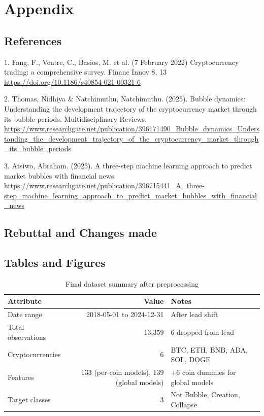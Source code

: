 \documentclass[12pt,a4paper]{article}
\begin{document}
\newpage
\section{Appendix}

\subsection{References}
1. Fang, F., Ventre, C., Basios, M. et al. (7 February 2022) Cryptocurrency trading: a comprehensive survey. Financ Innov 8, 13 \url{https://doi.org/10.1186/s40854-021-00321-6} 

2. Thomas, Nidhiya \& Natchimuthu, Natchimuthu. (2025). Bubble dynamics: Understanding the development trajectory of the cryptocurrency market through its bubble periods. Multidisciplinary Reviews. \url{https://www.researchgate.net/publication/396171490_Bubble_dynamics_Understanding_the_development_trajectory_of_the_cryptocurrency_market_through_its_bubble_periods} 

3. Atsiwo, Abraham. (2025). A three-step machine learning approach to predict market bubbles with financial news. \url{https://www.researchgate.net/publication/396715441_A_three-step_machine_learning_approach_to_predict_market_bubbles_with_financial_news} 





\newpage
\subsection{Rebuttal and Changes made}



\subsection{Tables and Figures}


\begin{table}[h]
\centering
\small
\caption{Final dataset summary after preprocessing}
\label{tab:dataset_summary}
\begin{tabular}{lrl}
\toprule
Attribute & Value & Notes \\
\midrule
Date range & 2018-05-01 to 2024-12-31 & After lead shift \\
Total observations & 13,359 & 6 dropped from lead \\
Cryptocurrencies & 6 & BTC, ETH, BNB, ADA, SOL, DOGE \\
Features & 133 (per-coin models), 139 (global models) &  +6 coin dummies for global models \\
Target classes & 3 & Not Bubble, Creation, Collapse \\
\bottomrule
\end{tabular}
\end{table}
\end{document}
